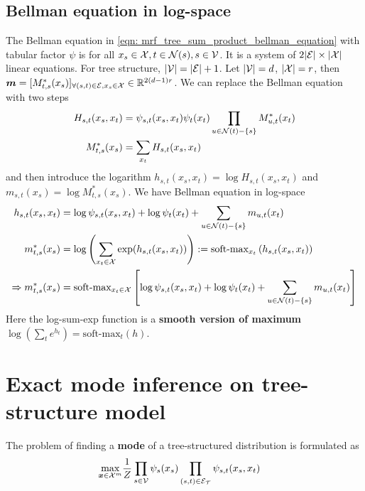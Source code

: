 \documentclass[11pt]{article}
\begin{document}
\subsection{Bellman equation in log-space}
The Bellman equation in  \eqref{eqn: mrf_tree_sum_product_bellman_equation} with tabular factor $\psi$ is for all $x_s \in {\mathcal X}, t\in {\mathcal N}(s), s\in {\mathcal V}$. It is a system of $2|{\mathcal E}| \times |{\mathcal X}|$ linear equations. For tree structure, $|{\mathcal V}| = |{\mathcal E}| + 1$. Let $|{\mathcal V}| =d$, $|{\mathcal X}| = r$, then $\boldsymbol{m}= [M_{t,s}^{*}(x_s)]_{\forall (s,t)\in {\mathcal E}, x_s\in {\mathcal X}} \in {\mathbb R}^{2(d-1)r}$. We can replace the Bellman equation with two steps
\begin{align*}
H_{s,t}(x_s, x_t) &= \psi_{s,t}(x_s, x_t)\psi_{t}(x_t)\prod_{u \in {\mathcal N}(t) - \left\{s\right\}}M_{u,t}^{*}(x_t) \\
M_{t,s}^{*}(x_s) &= \sum_{x_t}H_{s,t}(x_s, x_t) 
\end{align*} and then introduce the logarithm $h_{s,t}(x_s, x_t) = \log H_{s,t}(x_s, x_t) $ and $m_{s,t}(x_s) = \log M_{t,s}^{*}(x_s) $. We have Bellman equation in log-space
\begin{align}
h_{s,t}(x_s, x_t) &= \log  \psi_{s,t}(x_s, x_t) + \log \psi_{t}(x_t) + \sum_{u \in {\mathcal N}(t) - \left\{s\right\}}  m_{u,t}(x_t) \label{eqn: mrf_tree_sum_product_bellman_equation_log_factor}\\
m_{t,s}^{*}(x_s) &= \log\left(\sum_{x_t \in {\mathcal X}}\exp(h_{s,t}(x_s, x_t))\right) := \text{soft-max}_{x_t}\left(h_{s,t}(x_s, x_t)\right)  \label{eqn: mrf_tree_sum_product_bellman_equation_log_message}\\
\Rightarrow m_{t,s}^{*}(x_s) &= \text{soft-max}_{x_t \in {\mathcal X}}\left[\log  \psi_{s,t}(x_s, x_t) + \log \psi_{t}(x_t) + \sum_{u \in {\mathcal N}(t) - \left\{s\right\}}  m_{u,t}(x_t)\right]  \label{eqn: mrf_tree_sum_product_bellman_equation_log}
\end{align} Here the log-sum-exp function is a \textbf{smooth version of maximum} $\log(\sum_t e^{h_t}) = \text{soft-max}_{t}(h)$.



\section{Exact mode inference on tree-structure model}
The problem of finding a \textbf{mode} of a tree-structured distribution is formulated as
\begin{align}
\max_{\boldsymbol{x}\in {\mathcal X}^m} & \frac{1}{Z}\prod_{s\in {\mathcal V}}\psi_{s}(x_{s})\prod_{(s,t) \in {\mathcal E}_{{\mathcal T}}}\psi_{s,t}(x_{s}, x_{t})  \label{eqn: mode_finding} 
\end{align}
\end{document}
